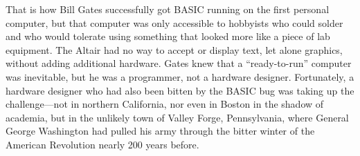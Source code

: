 That is how Bill Gates successfully got BASIC running on the first
personal computer, but that computer was only accessible to hobbyists
who could solder and who would tolerate using something that looked
more like a piece of lab equipment.
The Altair had no way to accept or display text, let alone graphics,
without adding additional hardware.
Gates knew that a ``ready-to-run'' computer was inevitable, but he was
a programmer, not a hardware designer.
Fortunately, a hardware designer who had also been bitten by the BASIC
bug was taking up the challenge---not in northern California, nor even
in Boston in the shadow of academia, but in the unlikely town of
Valley Forge, Pennsylvania, where General George Washington had pulled
his army through the bitter winter of the American Revolution nearly
200 years before.




